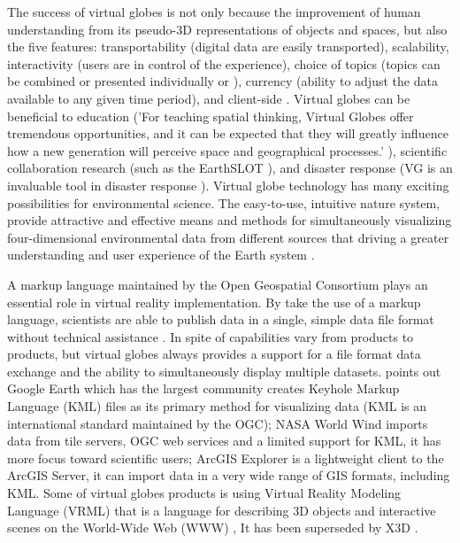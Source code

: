 The success of virtual globes \parencite{tuttle.virtual-globes.2008} is not only because the improvement of human understanding from its pseudo-3D representations of objects and spaces, but also the five features: transportability (digital data are easily transported), scalability, interactivity (users are in control of the experience), choice of topics (topics can be combined or presented individually or ), currency (ability to adjust the data available to any given time period), and client-side \parencite{tuttle.virtual-globes.2008}. Virtual globes can be beneficial to education ('For teaching spatial thinking, Virtual Globes offer tremendous opportunities, and it can be expected that they will greatly influence how a new generation will perceive space and geographical processes.' \parencite{nuernberger.vr-classroom.2006}), scientific collaboration research (such as the EarthSLOT \parencite{earthslot.2016}), and disaster response (VG is an invaluable tool in disaster response \parencite{butler.vg.2006, nourbakhsh.mapping-disaster-zones.2006}). Virtual globe technology has many exciting possibilities for environmental science. The easy-to-use, intuitive nature system, provide attractive and effective means and methods for simultaneously visualizing four-dimensional environmental data from different sources that driving a greater understanding and user experience of the Earth system \parencite{blower.sharing-visualizing.2007}. 

A markup language maintained by the Open Geospatial Consortium \parencite{ogc.2016} plays an essential role in virtual reality implementation. By take the use of a markup language, scientists are able to publish data in a single, simple data file format without technical assistance \parencite{blower.sharing-visualizing.2007}. In spite of capabilities vary from products to products, but virtual globes always provides a support for a file format data exchange and the ability to simultaneously display multiple datasets. \parencite{blower.sharing-visualizing.2007} points out Google Earth which has the largest community creates Keyhole Markup Language (KML) \parencite{Google.kml.2016} files as its primary method for visualizing data (KML is an international standard maintained by the OGC); NASA World Wind \parencite{nasa.world-wind.2016} imports data from tile servers, OGC web services and a limited support for KML, it has more focus toward scientific users; ArcGIS Explorer \parencite{esri.arcgis-explorer.2016} is a lightweight client to the ArcGIS Server, it can import data in a very wide range of GIS formats, including KML. Some of virtual globes products is using Virtual Reality Modeling Language (VRML) \parencite{wiki.vrml.2016} that is a language for describing 3D objects and interactive scenes on the World-Wide Web (WWW) \parencite{wiki.www.2016}, It has been superseded by X3D \parencite{wiki.x3d.2016}.

